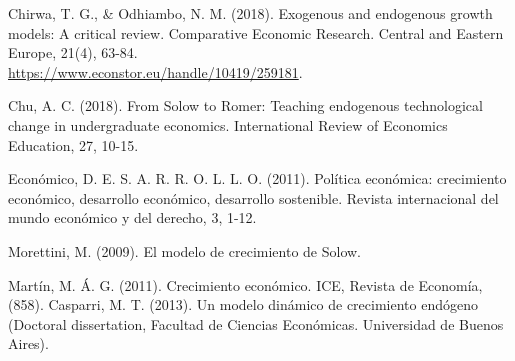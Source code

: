 \documentclass[letterpaper, 10pt]{article}
\begin{document}
\begin{thebibliography}{99} %



Chirwa, T. G., \& Odhiambo, N. M. (2018). Exogenous and endogenous growth models: A critical review. Comparative Economic Research. Central and Eastern Europe, 21(4), 63-84.\\
\url{https://www.econstor.eu/handle/10419/259181}.

Chu, A. C. (2018). From Solow to Romer: Teaching endogenous technological change in undergraduate economics. International Review of Economics Education, 27, 10-15.

Económico, D. E. S. A. R. R. O. L. L. O. (2011). Política económica: crecimiento económico, desarrollo económico, desarrollo sostenible. Revista internacional del mundo económico y del derecho, 3, 1-12.

 Morettini, M. (2009). El modelo de crecimiento de Solow.

 Martín, M. Á. G. (2011). Crecimiento económico. ICE, Revista de Economía, (858).
 Casparri, M. T. (2013). Un modelo dinámico de crecimiento endógeno (Doctoral dissertation, Facultad de Ciencias Económicas. Universidad de Buenos Aires).

\end{thebibliography}
\end{document}
